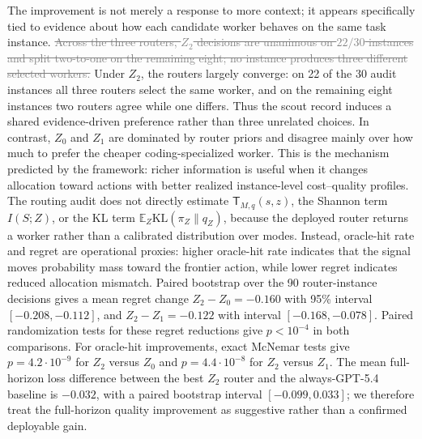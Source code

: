 \documentclass{article}
\newcommand{\oldtext}[1]{\textcolor{gray}{\sout{#1}}}
\newcommand{\newtext}[1]{\textcolor{green!50!black}{#1}}
\begin{document}
The improvement is not merely a response to more context; it appears specifically tied to evidence about how each candidate worker behaves on the same task instance.
\oldtext{Across the three routers, \(Z_2\) decisions are unanimous on \(22/30\) instances and split two-to-one on the remaining eight; no instance produces three different selected workers.}
\newtext{Under \(Z_2\), the routers largely converge: on 22 of the 30 audit instances all three routers select the same worker, and on the remaining eight instances two routers agree while one differs. Thus the scout record induces a shared evidence-driven preference rather than three unrelated choices.}
In contrast, \(Z_0\) and \(Z_1\) are dominated by router priors and disagree mainly over how much to prefer the cheaper coding-specialized worker.
This is the mechanism predicted by the framework: richer information is useful when it changes allocation toward actions with better realized instance-level cost--quality profiles.
The routing audit does not directly estimate \(\mathsf T_{M,q}(s,z)\), the Shannon term \(I(S;Z)\), or the KL term \(\mathbb E_Z\mathrm{KL}(\pi_Z\|q_Z)\), because the deployed router returns a worker rather than a calibrated distribution over modes.
Instead, oracle-hit rate and regret are operational proxies: higher oracle-hit rate indicates that the signal moves probability mass toward the frontier action, while lower regret indicates reduced allocation mismatch.
Paired bootstrap over the 90 router-instance decisions gives a mean regret change \(Z_2-Z_0=-0.160\) with 95\% interval \([-0.208,-0.112]\), and \(Z_2-Z_1=-0.122\) with interval \([-0.168,-0.078]\).
Paired randomization tests for these regret reductions give \(p<10^{-4}\) in both comparisons.
For oracle-hit improvements, exact McNemar tests give \(p=4.2\cdot 10^{-9}\) for \(Z_2\) versus \(Z_0\) and \(p=4.4\cdot 10^{-8}\) for \(Z_2\) versus \(Z_1\).
The mean full-horizon loss difference between the best \(Z_2\) router and the always-GPT-5.4 baseline is \(-0.032\), with a paired bootstrap interval \([-0.099,0.033]\); we therefore treat the full-horizon quality improvement as suggestive rather than a confirmed deployable gain.
\end{document}
